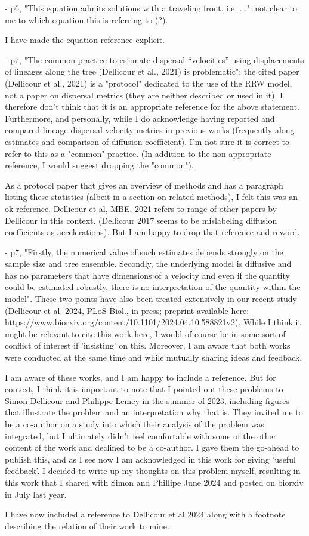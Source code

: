 \documentclass[11pt, oneside]{article}   	%
\newcommand{\response}[1]{{\color{black}{\bf Response:} #1}}
\begin{document}
- p6, "This equation admits solutions with a traveling front, i.e. ...": not clear to me to which equation this is referring to (?).

\response{I have made the equation reference explicit.}

- p7, "The common practice to estimate dispersal “velocities” using displacements of lineages along the tree (Dellicour et al., 2021) is problematic": the cited paper (Dellicour et al., 2021) is a "protocol" dedicated to the use of the RRW model, not a paper on dispersal metrics (they are neither described or used in it). I therefore don't think that it is an appropriate reference for the above statement. Furthermore, and personally, while I do acknowledge having reported and compared lineage dispersal velocity metrics in previous works (frequently along estimates and comparison of diffusion coefficient), I'm not sure it is correct to refer to this as a "common" practice. (In addition to the non-appropriate reference, I would suggest dropping the "common").

\response{As a protocol paper that gives an overview of methods and has a paragraph listing these statistics (albeit in a section on related methods), I felt this was an ok reference. Dellicour et al, MBE, 2021 refers to range of other papers by Dellicour in this context. (Dellicour 2017 seems to be mislabeling diffusion coefficients as accelerations). But I am happy to drop that reference and reword. }


- p7, "Firstly, the numerical value of such estimates depends strongly on the sample size and tree ensemble. Secondly, the underlying model is diffusive and has no parameters that have dimensions of a velocity and even if the quantity could be estimated robustly, there is no interpretation of the quantity within the model". These two points have also been treated extensively in our recent study (Dellicour et al. 2024, PLoS Biol., in press; preprint available here: https://www.biorxiv.org/content/10.1101/2024.04.10.588821v2). While I think it might be relevant to cite this work here, I would of course be in some sort of conflict of interest if 'insisting' on this. Moreover, I am aware that both works were conducted at the same time and while mutually sharing ideas and feedback.

\response{I am aware of these works, and I am happy to include a reference. But for context, I think it is important to note that I pointed out these problems to Simon Dellicour and Philippe Lemey in the summer of 2023, including figures that illustrate the problem and an interpretation why that is. They invited me to be a co-author on a study into which their analysis of the problem was integrated, but I ultimately didn't feel comfortable with some of the other content of the work and declined to be a co-author. I gave them the go-ahead to publish this, and as I see now I am acknowledged in this work for giving 'useful feedback'. I decided to write up my thoughts on this problem myself, resulting in this work that I shared with Simon and Phillipe June 2024 and posted on biorxiv in July last year.

I have now included a reference to Dellicour et al 2024 along with a footnote describing the relation of their work to mine.}
\end{document}
